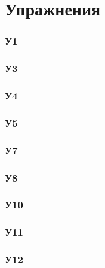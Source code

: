 \section{Упражнения}

\subsubsection*{У1}


% 

\subsubsection*{У3}


\subsubsection*{У4}


\subsubsection*{У5}


% 

\subsubsection*{У7}


\subsubsection*{У8}


% 

\subsubsection*{У10}


\subsubsection*{У11}


\subsubsection*{У12}
